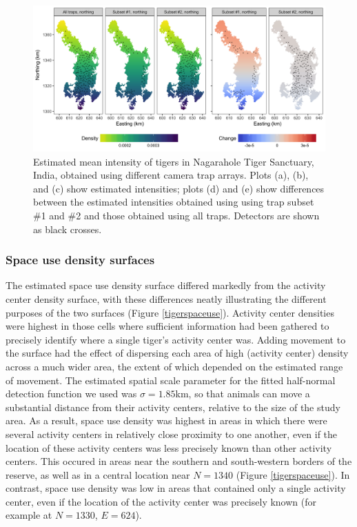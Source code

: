 \documentclass[a4paper,12pt]{article}
\begin{document}
\begin{figure}[htbp]
\centering
\includegraphics[width=1\textwidth]{tiger_surfaces_covs}
\caption{Estimated mean intensity of tigers in Nagarahole Tiger Sanctuary, India, obtained using different camera trap arrays. Plots (a), (b), and (c) show estimated intensities; plots (d) and (e) show differences between the estimated intensities obtained using using trap subset \#1 and \#2 and those obtained using all traps. Detectors are shown as black crosses.}
\label{tigercov}
\end{figure}

\subsubsection{Space use density surfaces}

The estimated space use density surface differed markedly from the activity center density surface, with these differences neatly illustrating the different purposes of the two surfaces (Figure \ref{tigerspaceuse}). Activity center densities were highest in those cells where sufficient information had been gathered to precisely identify where a single tiger's activity center was. Adding movement to the surface had the effect of dispersing each area of high (activity center) density across a much wider area, the extent of which depended on the estimated range of movement. The estimated spatial scale parameter for the fitted half-normal detection function we used was $\sigma=1.85$km, so that animals can move a substantial distance from their activity centers, relative to the size of the study area. As a result, space use density was highest in areas in which there were several activity centers in relatively close proximity to one another, even if the location of these activity centers was less precisely known than other activity centers. This occured in areas near the southern and south-western borders of the reserve, as well as in a central location near $N=1340$ (Figure \ref{tigerspaceuse}). In contrast, space use density was low in areas that contained only a single activity center, even if the location of the activity center was precisely known (for example at $N=1330$, $E=624$).
\end{document}
